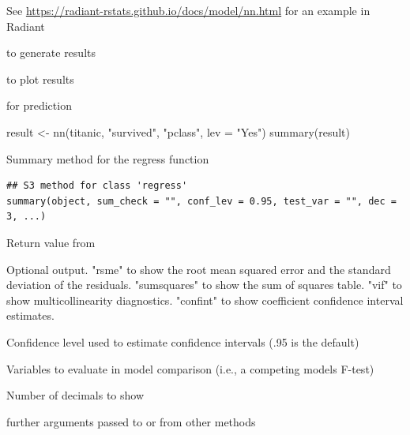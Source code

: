 \documentclass[a4paper]{book}
\begin{document}
%
\begin{Details}
See \url{https://radiant-rstats.github.io/docs/model/nn.html} for an example in Radiant
\end{Details}
%
\begin{SeeAlso}
 to generate results

 to plot results

 for prediction
\end{SeeAlso}
%
\begin{Examples}
\begin{ExampleCode}
result <- nn(titanic, "survived", "pclass", lev = "Yes")
summary(result)
\end{ExampleCode}
\end{Examples}
%
\begin{Description}
Summary method for the regress function
\end{Description}
%
\begin{Usage}
\begin{verbatim}
## S3 method for class 'regress'
summary(object, sum_check = "", conf_lev = 0.95, test_var = "", dec = 3, ...)
\end{verbatim}
\end{Usage}
%
\begin{Arguments}
\begin{ldescription}
\item[\code{object}] Return value from 

\item[\code{sum\_check}] Optional output. "rsme" to show the root mean squared error and the standard deviation of the residuals. "sumsquares" to show the sum of squares table. "vif" to show multicollinearity diagnostics. "confint" to show coefficient confidence interval estimates.

\item[\code{conf\_lev}] Confidence level used to estimate confidence intervals (.95 is the default)

\item[\code{test\_var}] Variables to evaluate in model comparison (i.e., a competing models F-test)

\item[\code{dec}] Number of decimals to show

\item[\code{...}] further arguments passed to or from other methods
\end{ldescription}
\end{Arguments}
\end{document}
